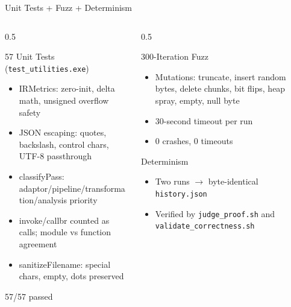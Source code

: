 \documentclass[aspectratio=169]{beamer}
\newcommand{\green}[1]{\textcolor{LPTAGreen}{#1}}
\begin{document}
\begin{frame}{Unit Tests + Fuzz + Determinism}
  \begin{columns}[T,onlytextwidth]
    \begin{column}{0.5\textwidth}
      \begin{block}{57 Unit Tests (\texttt{test\_utilities.exe})}
        \begin{itemize}
          \item IRMetrics: zero-init, delta math, unsigned overflow safety
          \item JSON escaping: quotes, backslash, control chars, UTF-8 passthrough
          \item classifyPass: adaptor/pipeline/transformation/analysis priority
          \item invoke/callbr counted as calls; module vs function agreement
          \item sanitizeFilename: special chars, empty, dots preserved
        \end{itemize}
        \green{57/57 passed}
      \end{block}
    \end{column}
    \begin{column}{0.5\textwidth}
      \begin{block}{300-Iteration Fuzz}
        \begin{itemize}
          \item Mutations: truncate, insert random bytes, delete chunks, bit flips, heap spray, empty, null byte
          \item 30-second timeout per run
          \item \green{0 crashes, 0 timeouts}
        \end{itemize}
      \end{block}
      \begin{block}{Determinism}
        \begin{itemize}
          \item Two runs $\to$ byte-identical \texttt{history.json}
          \item Verified by \texttt{judge\_proof.sh} and \texttt{validate\_correctness.sh}
        \end{itemize}
      \end{block}
    \end{column}
  \end{columns}
\end{frame}
\end{document}

